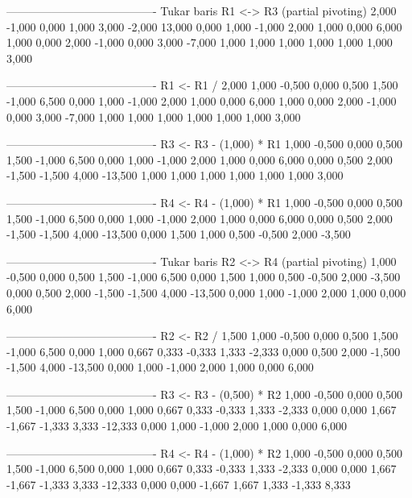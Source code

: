 \documentclass[12pt]{article}
\begin{document}
\begin{enumerate}
\begin{keluaran}
----------------------------------------
Tukar baris R1 <-> R3 (partial pivoting)
2,000   -1,000  0,000   1,000   3,000   -2,000  13,000
0,000   1,000   -1,000  2,000   1,000   0,000   6,000
1,000   0,000   2,000   -1,000  0,000   3,000   -7,000
1,000   1,000   1,000   1,000   1,000   1,000   3,000

----------------------------------------
R1 <- R1 / 2,000
1,000   -0,500  0,000   0,500   1,500   -1,000  6,500
0,000   1,000   -1,000  2,000   1,000   0,000   6,000
1,000   0,000   2,000   -1,000  0,000   3,000   -7,000
1,000   1,000   1,000   1,000   1,000   1,000   3,000

----------------------------------------
R3 <- R3 - (1,000) * R1
1,000   -0,500  0,000   0,500   1,500   -1,000  6,500
0,000   1,000   -1,000  2,000   1,000   0,000   6,000
0,000   0,500   2,000   -1,500  -1,500  4,000   -13,500
1,000   1,000   1,000   1,000   1,000   1,000   3,000

----------------------------------------
R4 <- R4 - (1,000) * R1
1,000   -0,500  0,000   0,500   1,500   -1,000  6,500
0,000   1,000   -1,000  2,000   1,000   0,000   6,000
0,000   0,500   2,000   -1,500  -1,500  4,000   -13,500
0,000   1,500   1,000   0,500   -0,500  2,000   -3,500

----------------------------------------
Tukar baris R2 <-> R4 (partial pivoting)
1,000   -0,500  0,000   0,500   1,500   -1,000  6,500
0,000   1,500   1,000   0,500   -0,500  2,000   -3,500
0,000   0,500   2,000   -1,500  -1,500  4,000   -13,500
0,000   1,000   -1,000  2,000   1,000   0,000   6,000

----------------------------------------
R2 <- R2 / 1,500
1,000   -0,500  0,000   0,500   1,500   -1,000  6,500
0,000   1,000   0,667   0,333   -0,333  1,333   -2,333
0,000   0,500   2,000   -1,500  -1,500  4,000   -13,500
0,000   1,000   -1,000  2,000   1,000   0,000   6,000

----------------------------------------
R3 <- R3 - (0,500) * R2
1,000   -0,500  0,000   0,500   1,500   -1,000  6,500
0,000   1,000   0,667   0,333   -0,333  1,333   -2,333
0,000   0,000   1,667   -1,667  -1,333  3,333   -12,333
0,000   1,000   -1,000  2,000   1,000   0,000   6,000

----------------------------------------
R4 <- R4 - (1,000) * R2
1,000   -0,500  0,000   0,500   1,500   -1,000  6,500
0,000   1,000   0,667   0,333   -0,333  1,333   -2,333
0,000   0,000   1,667   -1,667  -1,333  3,333   -12,333
0,000   0,000   -1,667  1,667   1,333   -1,333  8,333


\end{keluaran}
\end{enumerate}
\end{document}
